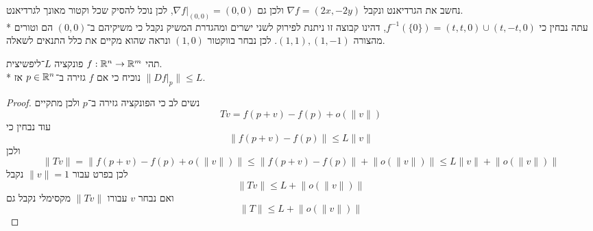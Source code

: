 נחשב את הגרדיאנט ונקבל $\nabla f = (2x, -2y)$ ולכן גם $\nabla f |_{(0, 0)} = (0, 0)$, לכן נוכל להסיק שכל וקטור מאונך לגרדיאנט. \\*
עתה נבחין כי $f^{-1}(\{0\}) = (t, t, 0) \cup (t, -t, 0)$, דהינו קבוצה זו ניתנת לפירוק לשני ישרים ומהגדרת המשיק נקבל כי משיקיהם ב־$(0, 0)$ הם וטורים מהצורה $(1, 1), (1, -1)$.
לכן נבחר בווקטור $(1, 0)$ ונראה שהוא מקיים את כלל התנאים לשאלה.

\Question{}
תהי $f : \mathbb{R}^n \to \mathbb{R}^m$ פונקציה $L$־ליפשיצית. \\*
נוכיח כי אם $f$ גזירה ב־$p \in \mathbb{R}^n$ אז $\lVert Df |_p \rVert \le L$.
\begin{proof}
	נשים לב כי הפונקציה גזירה ב־$p$ ולכן מתקיים
	\[
		Tv = f(p + v) - f(p) + o(\lVert v \rVert)
	\]
	עוד נבחין כי
	\[
		\lVert f(p + v) - f(p) \rVert \le L \lVert v \rVert
	\]
	ולכן
	\[
		\lVert Tv \rVert
		= \lVert f(p + v) - f(p) + o(\lVert v \rVert) \rVert
		\le \lVert f(p + v) - f(p) \rVert + \lVert o(\lVert v \rVert) \rVert
		\le L \lVert v \rVert + \lVert o(\lVert v \rVert) \rVert
	\]
	לכן בפרט עבור $\lVert v \rVert = 1$ נקבל
	\[
		\lVert Tv \rVert
		\le L + \lVert o(\lVert v \rVert) \rVert
	\]
	ואם נבחר $v$ עבורו $\lVert Tv \rVert$ מקסימלי נקבל גם
	\[
		\lVert T \rVert
		\le L + \lVert o(\lVert v \rVert) \rVert
	\]
\end{proof}


